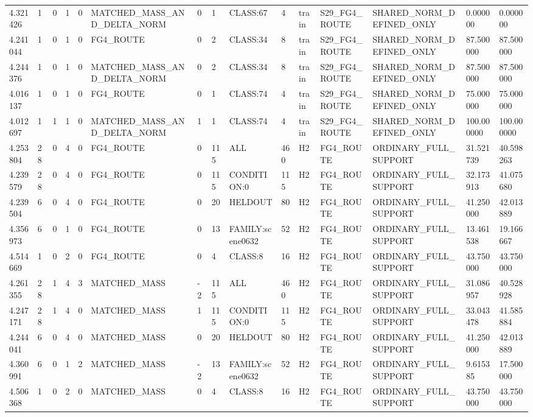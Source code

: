 \begin{tabular}{lllllllllllllll}
4.321426 & 1 & 0 & 1 & 0 & MATCHED\_MASS\_AND\_DELTA\_NORM & 0 & 1 & CLASS:67 & 4 & train & S29\_FG4\_ROUTE & SHARED\_NORM\_DEFINED\_ONLY & 0.000000 & 0.000000 \\
4.241044 & 1 & 0 & 1 & 0 & FG4\_ROUTE & 0 & 2 & CLASS:34 & 8 & train & S29\_FG4\_ROUTE & SHARED\_NORM\_DEFINED\_ONLY & 87.500000 & 87.500000 \\
4.244376 & 1 & 0 & 1 & 0 & MATCHED\_MASS\_AND\_DELTA\_NORM & 0 & 2 & CLASS:34 & 8 & train & S29\_FG4\_ROUTE & SHARED\_NORM\_DEFINED\_ONLY & 87.500000 & 87.500000 \\
4.016137 & 1 & 0 & 1 & 0 & FG4\_ROUTE & 0 & 1 & CLASS:74 & 4 & train & S29\_FG4\_ROUTE & SHARED\_NORM\_DEFINED\_ONLY & 75.000000 & 75.000000 \\
4.012697 & 1 & 1 & 1 & 0 & MATCHED\_MASS\_AND\_DELTA\_NORM & 1 & 1 & CLASS:74 & 4 & train & S29\_FG4\_ROUTE & SHARED\_NORM\_DEFINED\_ONLY & 100.000000 & 100.000000 \\
4.253804 & 28 & 0 & 4 & 0 & FG4\_ROUTE & 0 & 115 & ALL & 460 & H2 & FG4\_ROUTE & ORDINARY\_FULL\_SUPPORT & 31.521739 & 40.598263 \\
4.239579 & 28 & 0 & 4 & 0 & FG4\_ROUTE & 0 & 115 & CONDITION:0 & 115 & H2 & FG4\_ROUTE & ORDINARY\_FULL\_SUPPORT & 32.173913 & 41.075680 \\
4.239504 & 6 & 0 & 4 & 0 & FG4\_ROUTE & 0 & 20 & HELDOUT & 80 & H2 & FG4\_ROUTE & ORDINARY\_FULL\_SUPPORT & 41.250000 & 42.013889 \\
4.356973 & 6 & 0 & 1 & 0 & FG4\_ROUTE & 0 & 13 & FAMILY:scene0632 & 52 & H2 & FG4\_ROUTE & ORDINARY\_FULL\_SUPPORT & 13.461538 & 19.166667 \\
4.514669 & 1 & 0 & 2 & 0 & FG4\_ROUTE & 0 & 4 & CLASS:8 & 16 & H2 & FG4\_ROUTE & ORDINARY\_FULL\_SUPPORT & 43.750000 & 43.750000 \\
4.261355 & 28 & 1 & 4 & 3 & MATCHED\_MASS & -2 & 115 & ALL & 460 & H2 & FG4\_ROUTE & ORDINARY\_FULL\_SUPPORT & 31.086957 & 40.528928 \\
4.247171 & 28 & 1 & 4 & 0 & MATCHED\_MASS & 1 & 115 & CONDITION:0 & 115 & H2 & FG4\_ROUTE & ORDINARY\_FULL\_SUPPORT & 33.043478 & 41.585884 \\
4.244041 & 6 & 0 & 4 & 0 & MATCHED\_MASS & 0 & 20 & HELDOUT & 80 & H2 & FG4\_ROUTE & ORDINARY\_FULL\_SUPPORT & 41.250000 & 42.013889 \\
4.360991 & 6 & 0 & 1 & 2 & MATCHED\_MASS & -2 & 13 & FAMILY:scene0632 & 52 & H2 & FG4\_ROUTE & ORDINARY\_FULL\_SUPPORT & 9.615385 & 17.500000 \\
4.506368 & 1 & 0 & 2 & 0 & MATCHED\_MASS & 0 & 4 & CLASS:8 & 16 & H2 & FG4\_ROUTE & ORDINARY\_FULL\_SUPPORT & 43.750000 & 43.750000 \\

\end{tabular}
